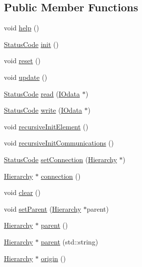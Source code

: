 \subsection*{Public Member Functions}
\begin{DoxyCompactItemize}
\item 
void \hyperlink{structInterfaceWrap_abcf87065a7b9099a7d05e7c0ddaf2487}{help} ()
\item 
\hyperlink{classStatusCode}{StatusCode} \hyperlink{structInterfaceWrap_a2660ecdfbabd91d99d7b64c83e92f33c}{init} ()
\item 
void \hyperlink{structInterfaceWrap_a6c350b2f44c579187e6e4269cae29bae}{reset} ()
\item 
void \hyperlink{structInterfaceWrap_aee2f0407da52a1de8659b1d83af62238}{update} ()
\item 
\hyperlink{classStatusCode}{StatusCode} \hyperlink{structInterfaceWrap_a4dd40213e6d37c73521450aa0c7a8f4d}{read} (\hyperlink{classIOdata}{IOdata} $\ast$)
\item 
\hyperlink{classStatusCode}{StatusCode} \hyperlink{structInterfaceWrap_afbf6658c8be109e72f38d61438ec94d3}{write} (\hyperlink{classIOdata}{IOdata} $\ast$)
\item 
void \hyperlink{classElement_a3c0abcb36f8906688bb7e32608df7086}{recursiveInitElement} ()
\item 
void \hyperlink{classElement_a82119ed37dff76508a2746a853ec35ba}{recursiveInitCommunications} ()
\item 
\hyperlink{classStatusCode}{StatusCode} \hyperlink{classElement_ab476b4b1df5954141ceb14f072433b89}{setConnection} (\hyperlink{classHierarchy}{Hierarchy} $\ast$)
\item 
\hyperlink{classHierarchy}{Hierarchy} $\ast$ \hyperlink{classElement_af57444353c1ddf9fa0109801e97debf7}{connection} ()
\item 
void \hyperlink{classHierarchy_af4d43b0765b402670eed2d62c73405af}{clear} ()
\item 
void \hyperlink{classHierarchy_a585ad1aeec16077a0e532ab8b4fc557b}{setParent} (\hyperlink{classHierarchy}{Hierarchy} $\ast$parent)
\item 
\hyperlink{classHierarchy}{Hierarchy} $\ast$ \hyperlink{classHierarchy_a1c7bec8257e717f9c1465e06ebf845fc}{parent} ()
\item 
\hyperlink{classHierarchy}{Hierarchy} $\ast$ \hyperlink{classHierarchy_ad550588733bf75ac5c0fcfd7c8fd11a6}{parent} (std::string)
\item 
\hyperlink{classHierarchy}{Hierarchy} $\ast$ \hyperlink{classHierarchy_aee461dc930ce3871636ff87f075b1b83}{origin} ()

\end{DoxyCompactItemize}
